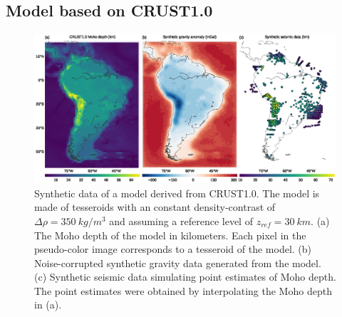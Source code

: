 \documentclass[extra]{gji}
\begin{document}





\subsection{Model based on CRUST1.0}

\begin{figure}
    \centering
    \includegraphics[width=\textwidth]{figures/synthetic-crust1-data}
    \caption{
        Synthetic data of a model derived from CRUST1.0.
        The model is made of tesseroids with an constant density-contrast
        of $\Delta\rho = 350\ kg/m^3$ and assuming a reference level of
        $z_{ref} = 30\ km$.
        (a) The Moho depth of the model in kilometers.
        Each pixel in the pseudo-color image corresponds to a tesseroid of the
        model.
        (b) Noise-corrupted synthetic gravity data generated from the model.
        (c) Synthetic seismic data simulating point estimates of Moho depth.
        The point estimates were obtained by interpolating
        the Moho depth in (a).
    }
    \label{fig:crust1-data}
\end{figure}
\end{document}
